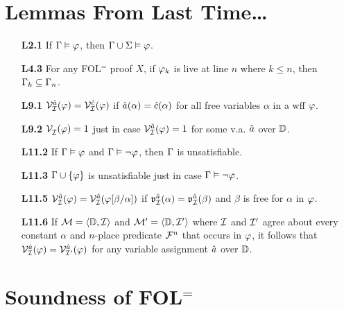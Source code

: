 \documentclass[a4paper, 11pt]{article} %
\begin{document}
\section*{Lemmas From Last Time\ldots}%
  \label{sec:Lemmas}
  
\begin{itemize}
  \item[\bf L2.1] If $\Gamma \vDash \varphi$, then $\Gamma \cup \Sigma \vDash \varphi$.
  \item[\bf L4.3] For any FOL$^=$ proof $X$, if $\varphi_k$ is live at line $n$ where $k\leq n$, then $\Gamma_k\subseteq \Gamma_{n}$.
  \item[\bf L9.1] $\mathcal{V}_{\mathcal{I}}^{\hat{a}}(\varphi)=\mathcal{V}_{\mathcal{I}}^{\hat{c}}(\varphi)$ if $\hat{a}(\alpha)=\hat{c}(\alpha)$ for all free variables $\alpha$ in a wff $\varphi$.
  \item[\bf L9.2] $\mathcal{V}_{\mathcal{I}}^{}(\varphi)= 1$ just in case $\mathcal{V}_{\mathcal{I}}^{\hat{a}}(\varphi)= 1$ for some v.a. $\hat{a}$ over $\mathbb{D}$.
  \item[\bf L11.2] If $\Gamma \vDash \varphi$ and $\Gamma \vDash \neg\varphi$, then $\Gamma$ is unsatisfiable.
  \item[\bf L11.3] $\Gamma \cup \lbrace\varphi\rbrace$ is unsatisfiable just in case $\Gamma \vDash \neg\varphi$.
  \item[\bf L11.5] $\mathcal{V}_{\mathcal{I}}^{\hat{a}}(\varphi)=\mathcal{V}_{\mathcal{I}}^{\hat{a}}(\varphi[\beta/\alpha])$ if $\mathfrak{v}_{\mathcal{I}}^{\hat{a}}(\alpha)=\mathfrak{v}_{\mathcal{I}}^{\hat{a}}(\beta)$ and $\beta$ is free for $\alpha$ in $\varphi$.
  \item[\bf L11.6] If $\mathcal{M}=\langle\mathbb{D},\mathcal{I}\rangle$ and $\mathcal{M}'=\langle\mathbb{D},\mathcal{I}'\rangle$ where $\mathcal{I}$ and $\mathcal{I}'$ agree about every constant $\alpha$ and $n$-place predicate $\mathcal{F}^n$ that occurs in $\varphi$, it follows that $\mathcal{V}_{\mathcal{I}}^{\hat{a}}(\varphi)=\mathcal{V}_{\mathcal{I}'}^{\hat{a}}(\varphi)$ for any variable assignment $\hat{a}$ over $\mathbb{D}$.
\end{itemize}




\section*{Soundness of FOL$^=$}
\end{document}
